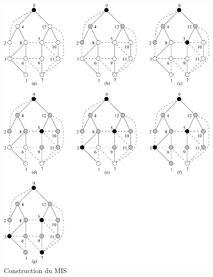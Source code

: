 \begin{figure}[ht]
\begin{center}
\includegraphics[scale=0.6]{images/figureMIS.jpg}
\caption{Construction du MIS}
\end{center}
\end{figure}

